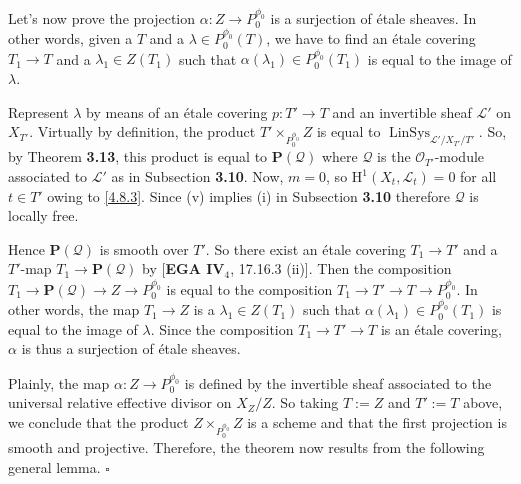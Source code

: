 \documentclass{article}
\newcommand{\LinSys}{\operatorname{LinSys}}
\begin{document}
Let's now prove the projection $\alpha : Z \to P^{\phi_0}_0$ is a surjection of \'{e}tale sheaves. In other words, given a $T$ and a $\lambda \in P^{\phi_0}_0(T)$, we have to find an \'{e}tale covering $T_1 \to T$ and a $\lambda_1 \in Z(T_1)$ such that $\alpha(\lambda_1) \in P^{\phi_0}_0(T_1)$ is equal to the image of $\lambda$.

Represent $\lambda$ by means of an \'{e}tale covering $p : T' \to T$ and an invertible sheaf $\mathcal{L}'$ on $X_{T'}$. Virtually by definition, the product $T' \times_{P^{\phi_0}_0} Z$ is equal to $\LinSys_{\mathcal{L}'/X_{T'}/T'}$. So, by Theorem \textbf{3.13}, this product is equal to $\mathbf{P}(\mathcal{Q})$ where $\mathcal{Q}$ is the $\mathcal{O}_{T'}$-module associated to $\mathcal{L}'$ as in Subsection \textbf{3.10}. Now, $m=0$, so $\mathrm{H}^1(X_t, \mathcal{L}_t) = 0$ for all $t \in T'$ owing to \eqref{4.8.3}. Since (v) implies (i) in Subsection \textbf{3.10} therefore $\mathcal{Q}$ is locally free.

Hence $\mathbf{P}(\mathcal{Q})$ is smooth over $T'$. So there exist an \'{e}tale covering $T_1 \to T'$ and a $T'$-map $T_1 \to \mathbf{P}(\mathcal{Q})$ by [\textbf{EGA IV}$_4$, 17.16.3 (ii)]. Then the composition $T_1 \to \mathbf{P}(\mathcal{Q}) \to Z \to P^{\phi_0}_0$ is equal to the composition $T_1 \to T' \to T \to P^{\phi_0}_0$. In other words, the map $T_1 \to Z$ is a $\lambda_1 \in Z(T_1)$ such that $\alpha(\lambda_1) \in P^{\phi_0}_0(T_1)$ is equal to the image of $\lambda$. Since the composition $T_1 \to T' \to T$ is an \'{e}tale covering, $\alpha$ is thus a surjection of \'{e}tale sheaves.

Plainly, the map $\alpha : Z \to P^{\phi_0}_0$ is defined by the invertible sheaf associated to the universal relative effective divisor on $X_Z/Z$. So taking $T := Z$ and $T' := T$ above, we conclude that the product $Z \times_{P^{\phi_0}_0} Z$ is a scheme and that the first projection is smooth and projective. Therefore, the theorem now results from the following general lemma. \hfill $\square$
\end{document}
